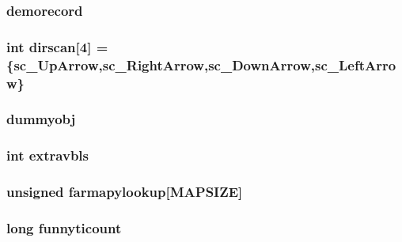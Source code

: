 \label{WL__PLAY_8C_aacc691a23998ed80395749868f5124e9}
\hypertarget{WL__PLAY_8C_a29ad9ab3cdb052a60b70348e9de1c33e}{
\subsubsection[{demorecord}]{ {\bf demorecord}}}
\label{WL__PLAY_8C_a29ad9ab3cdb052a60b70348e9de1c33e}
\hypertarget{WL__PLAY_8C_ac9e7de0629d53e5cfa59e985910855c5}{
\subsubsection[{dirscan}]{\setlength{\rightskip}{0pt plus 5cm}int {\bf dirscan}\mbox{[}4\mbox{]} = \{sc\_\-UpArrow,sc\_\-RightArrow,sc\_\-DownArrow,sc\_\-LeftArrow\}}}
\label{WL__PLAY_8C_ac9e7de0629d53e5cfa59e985910855c5}
\hypertarget{WL__PLAY_8C_a0e5a8cf650979c9507f17a53423b62d0}{
\subsubsection[{dummyobj}]{ {\bf dummyobj}}}
\label{WL__PLAY_8C_a0e5a8cf650979c9507f17a53423b62d0}
\hypertarget{WL__PLAY_8C_abb2d216c89203065d594e55c09f500d5}{
\subsubsection[{extravbls}]{\setlength{\rightskip}{0pt plus 5cm}int {\bf extravbls}}}
\label{WL__PLAY_8C_abb2d216c89203065d594e55c09f500d5}
\hypertarget{WL__PLAY_8C_a2d3a9ae720f57b0ebde086d13cdb9af7}{
\subsubsection[{farmapylookup}]{\setlength{\rightskip}{0pt plus 5cm}unsigned {\bf farmapylookup}\mbox{[}MAPSIZE\mbox{]}}}
\label{WL__PLAY_8C_a2d3a9ae720f57b0ebde086d13cdb9af7}
\hypertarget{WL__PLAY_8C_a04613e65e640f316854208a4fc7bdc02}{
\subsubsection[{funnyticount}]{\setlength{\rightskip}{0pt plus 5cm}long {\bf funnyticount}}}
